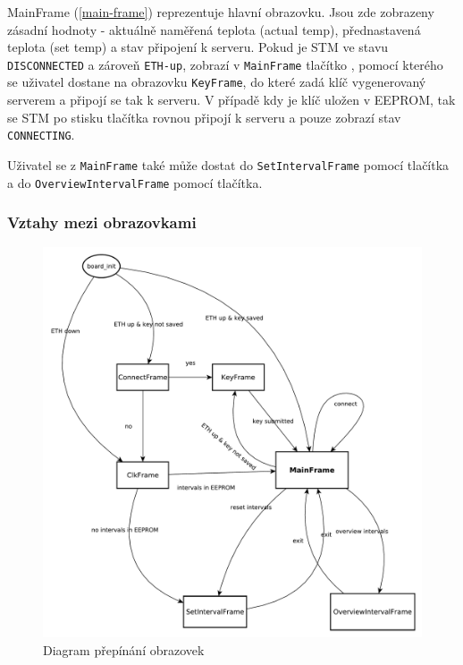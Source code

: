 MainFrame (\ref{main-frame}) reprezentuje hlavní obrazovku.
Jsou zde zobrazeny zásadní hodnoty - aktuálně naměřená teplota (actual temp), přednastavená teplota
(set temp) a stav připojení k serveru.
Pokud je STM ve stavu \texttt{DISCONNECTED} a zároveň \texttt{ETH-up}, zobrazí v \texttt{MainFrame}
tlačítko , pomocí kterého se uživatel dostane na obrazovku \texttt{KeyFrame}, do které zadá klíč
vygenerovaný serverem a připojí se tak k serveru.
V případě kdy je klíč uložen v EEPROM, tak se STM po stisku tlačítka  rovnou připojí k serveru
a pouze zobrazí stav \texttt{CONNECTING}.

Uživatel se z \texttt{MainFrame} také může dostat do \texttt{SetIntervalFrame} pomocí 
tlačítka a do \texttt{OverviewIntervalFrame} pomocí  tlačítka.

\subsubsection{Vztahy mezi obrazovkami}

\begin{figure}[tbh!]
\includegraphics[scale=0.51]{../diagrams/frame_diagram.pdf}
\caption{Diagram přepínání obrazovek}
\label{frame-diagram}
\end{figure}

